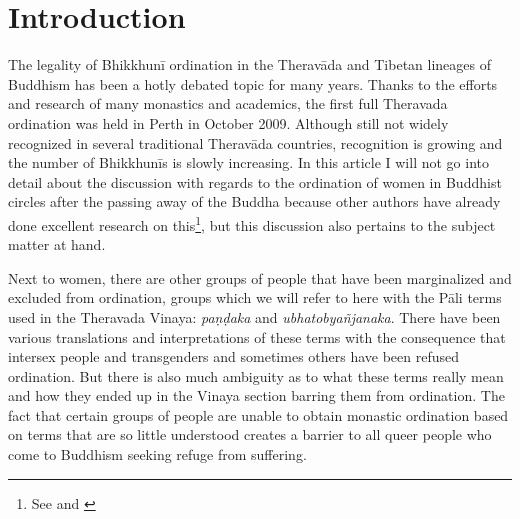 \section{Introduction}
The legality of Bhikkhunī ordination in the Theravāda and Tibetan lineages of Buddhism has been a hotly debated topic for many years. Thanks to the efforts and research of many monastics and academics, the first full Theravada ordination was held in Perth in October 2009. Although still not widely recognized in several traditional Theravāda countries, recognition is growing and the number of Bhikkhunīs is slowly increasing. In this article I will not go into detail about the discussion with regards to the ordination of women in Buddhist circles after the passing away of the Buddha because other authors have already done excellent research on this\footnote{See \cite{sujato2009} and \cite{analayo2013}}, but this discussion also pertains to the subject matter at hand.

Next to women, there are other groups of people that have been marginalized and excluded from ordination, groups which we will refer to here with the Pāli terms used in the Theravada Vinaya: {\em paṇḍaka} and {\em ubhatob­yañ­janaka}. There have been various translations and interpretations of these terms with the consequence that intersex people and transgenders and sometimes others have been refused ordination. But there is also much ambiguity as to what these terms really mean and how they ended up in the Vinaya section barring them from ordination. The fact that certain groups of people are unable to obtain monastic ordination based on terms that are so little understood creates a barrier to all queer people who come to Buddhism seeking refuge from suffering.

